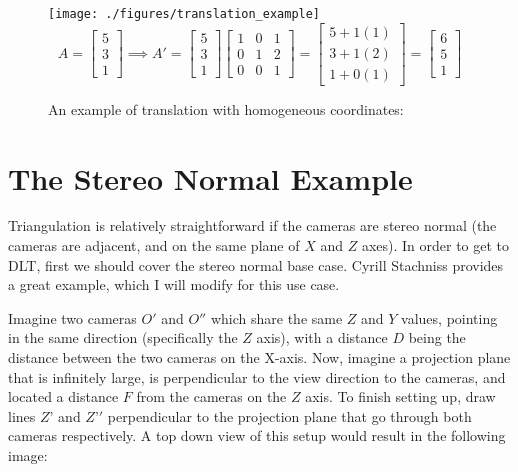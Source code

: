 \documentclass[12pt,twoside]{reedthesis}
\begin{document}
\begin{figure}[h]
	   
	       \centering
	    
	    \texttt{[image: ./figures/translation\_example]}
	    \[A = \begin{bmatrix}5\\3\\1\end{bmatrix} \implies A' = \begin{bmatrix}5\\3\\1\end{bmatrix}\begin{bmatrix}1&0&1\\0&1&2\\0&0&1\end{bmatrix} = \begin{bmatrix}5 + 1(1)\\3 + 1(2)\\1 + 0(1)\end{bmatrix}= \begin{bmatrix}6\\5\\1\end{bmatrix}
	    \]
	    \caption{An example of translation with homogeneous coordinates:}
	 \label{Translation Example}
	\end{figure}
	
\section{The Stereo Normal Example}

Triangulation is relatively straightforward if the cameras are stereo normal (the cameras are adjacent, and on the same plane of $X$ and $Z$ axes). In order to get to DLT, first we should cover the stereo normal base case. Cyrill Stachniss provides a great example, which I will modify for this use case.

	Imagine two cameras $O'$ and $O''$ which share the same $Z$ and $Y$ values, pointing in the same direction (specifically the $Z$ axis), with a distance $D$ being the distance between the two cameras on the X-axis. Now, imagine a projection plane that is infinitely large, is perpendicular to the view direction to the cameras, and located a distance $F$ from the cameras on the $Z$ axis. To finish setting up, draw lines $Z’$ and $Z’'$ perpendicular to the projection plane that go through both cameras respectively. A top down view of this setup would result in the following image: 
	
\end{document}
